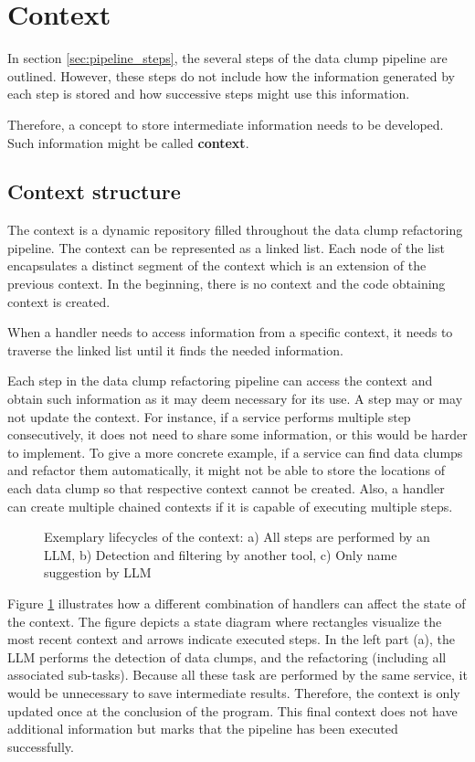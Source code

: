 \section{Context}\label{sec:context}
In section \ref{sec:pipeline_steps}, the several steps of the data clump pipeline are outlined. However, these steps do not include how the information generated by each step is stored and how successive steps might use this information.

Therefore, a concept to store intermediate information needs to be developed. Such information might be called \textbf{context}.
\subsection{Context structure}
The context is a  dynamic repository filled throughout the data clump refactoring pipeline. The context can be represented as a linked list. Each node of the list encapsulates a distinct segment of the context which is an extension of the previous context. In the beginning, there is no context and the code obtaining context is created.

When a handler needs to access information from a specific context, it needs to traverse the linked list until it finds the needed information. 


Each step in the data clump refactoring pipeline can access the context and obtain such information as it may deem necessary for its use. A step may or may not update the context. For instance, if a service performs multiple step consecutively, it does not need to share  some information, or this would be harder to implement. To give a more concrete example, if a service can find data clumps and refactor them automatically, it might not be able to store the locations of each data clump so that respective context cannot be created. Also, a handler can create multiple chained contexts if it is capable of executing multiple steps. 

\begin{figure}[ht!]
\centering
   
\caption{Exemplary lifecycles of the context: a) All steps are performed by an \ac{LLM}, b) Detection and filtering by another tool, c) Only name suggestion by \ac{LLM}}
\label{fig:context_lifecycle}
\end{figure}

Figure \ref{fig:context_lifecycle} illustrates how a different combination of handlers can affect the state of the context. The figure depicts a state diagram where rectangles visualize the most recent context and arrows indicate executed steps.  In the left part (a), the \ac{LLM} performs the detection of data clumps, and the refactoring (including all associated sub-tasks). Because all these task are performed by the same service, it would be unnecessary to save intermediate results. Therefore, the context is only updated once at the conclusion of the program. This final context does not have additional information but marks that the pipeline has been executed successfully.
 


